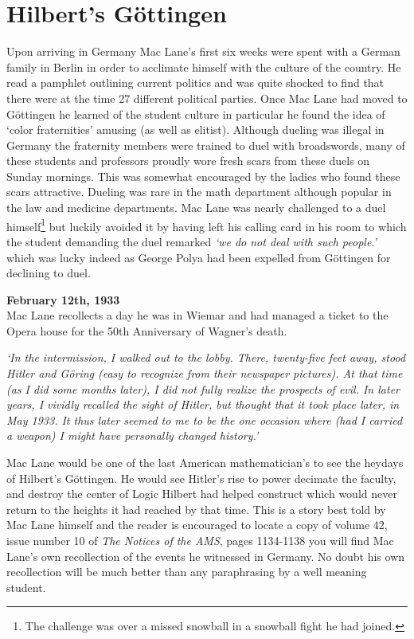 \section{Hilbert's G\"{o}ttingen}

Upon arriving in Germany Mac Lane's first six weeks were spent with a German family in Berlin in order to acclimate himself with the culture of the country. He read a pamphlet outlining current politics and was quite shocked to find that there were at the time 27 different political parties. Once Mac Lane had moved to G\"{o}ttingen he learned of the student culture in particular he found the idea of `color fraternities' amusing (as well as elitist). Although dueling was illegal in Germany the fraternity members were trained to duel with broadswords, many of these students and professors proudly wore fresh scars from these duels on Sunday mornings. This was somewhat encouraged by the ladies who found these scars attractive. Dueling was rare in the math department although popular in the law and medicine departments. Mac Lane was nearly challenged to a duel himself\footnote{The challenge was over a missed snowball in a snowball fight he had joined.} but luckily avoided it by having left his calling card in his room to which the student demanding the duel remarked \emph{`we do not deal with such people.'} which was lucky indeed as George Polya had been expelled from G\"{o}ttingen for declining to duel. 

\textbf{February 12th, 1933} \\
Mac Lane recollects a day he was in Wiemar and had managed a ticket to the Opera house for the 50th Anniversary of Wagner's death. 
\begin{center}
\emph{`In the intermission, I walked out to the lobby. There, twenty-five feet away, stood Hitler and Göring (easy to recognize from their newspaper pictures). At that time (as I did some months later), I did not fully realize the prospects of evil. In later years, I vividly recalled the sight of Hitler, but thought that it took place later, in May 1933. It thus later seemed to me to be the one occasion where (had I carried a weapon) I might have personally changed history.'} \cite{Mac1995}
\end{center}


Mac Lane would be one of the last American mathematician's to see the heydays of Hilbert's G\"{o}ttingen. He would see Hitler's rise to power decimate the faculty, and destroy the center of Logic Hilbert had helped construct which would never return to the heights it had reached by that time. This is a story best told by Mac Lane himself and the reader is encouraged to locate a copy of volume 42, issue number 10 of \emph{The Notices of the AMS}, pages 1134-1138 you will find Mac Lane's own recollection of the events he witnessed in Germany. No doubt his own recollection will be much better than any paraphrasing by a well meaning student. 

